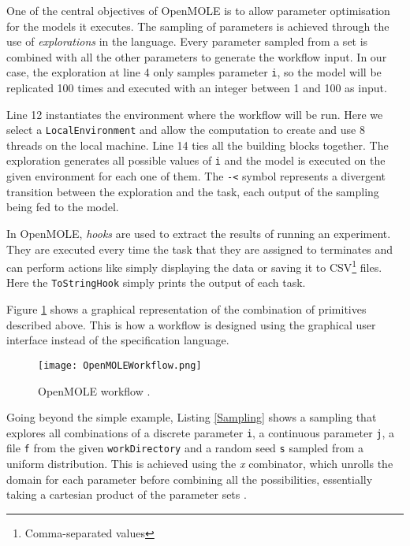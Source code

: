 One of the central objectives of OpenMOLE is to allow parameter optimisation for the models it executes. The sampling of parameters is achieved through the use of \textit{explorations} in the language. Every parameter sampled from a set is combined with all the other parameters to generate the workflow input. In our case, the exploration at line 4 only samples parameter \verb|i|, so the model will be replicated 100 times and executed with an integer between 1 and 100 as input.

Line 12 instantiates the environment where the workflow will be run. Here we select a \verb|LocalEnvironment| and allow the computation to create and use 8 threads on the local machine. Line 14 ties all the building blocks together. The exploration generates all possible values of \verb|i| and the model is executed on the given environment for each one of them. The \verb|-<| symbol represents a divergent transition between the exploration and the task, each output of the sampling being fed to the model.

In OpenMOLE, \textit{hooks} are used to extract the results of running an experiment. They are executed every time the task that they are assigned to terminates and can perform actions like simply displaying the data or saving it to CSV\footnote{Comma-separated values} files. Here the \verb|ToStringHook| simply prints the output of each task.

Figure \ref{OpenMOLEWorkflow} shows a graphical representation of the combination of primitives described above. This is how a workflow is designed using the graphical user interface instead of the specification language.

\begin{figure}[h]
	\centering
		\texttt{[image: OpenMOLEWorkflow.png]}
	\caption{OpenMOLE workflow \cite{OpenMOLE}.}
	\label{OpenMOLEWorkflow}
\end{figure}

Going beyond the simple example, Listing \ref{Sampling} shows a sampling that explores all combinations of a discrete parameter \verb|i|, a continuous parameter \verb|j|, a file \verb|f| from the given \verb|workDirectory| and a random seed \verb|s| sampled from a uniform distribution. This is achieved using the \textit{x} combinator, which unrolls the domain for each parameter before combining all the possibilities, essentially taking a cartesian product of the parameter sets \cite{OpenMOLEDSL}.

